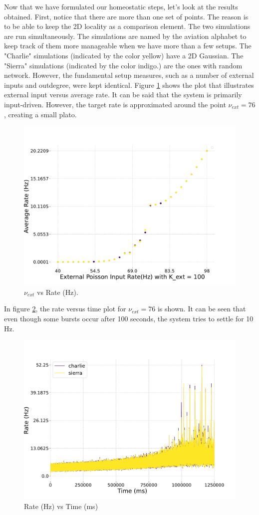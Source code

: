 \documentclass[a4paper,12pt]{article}
\begin{document}
Now that we have formulated our homeostatic steps, let's look at the results obtained. First, notice that there are more than one set of points. The reason is to be able to keep the 2D locality as a comparison element. The two simulations are run simultaneously. The simulations are named by the aviation alphabet to keep track of them more manageable when we have more than a few setups. The "Charlie" simulations (indicated by the color yellow) have a 2D Gaussian. The "Sierra" simulations (indicated by the color indigo.) are the ones with random network. However, the fundamental setup measures, such as a number of external inputs and outdegree, were kept identical. Figure \ref{charlie} shows the plot that illustrates external input versus average rate. It can be said that the system is primarily input-driven. However, the target rate is approximated around the point $\nu_{ext} = 76$, creating a small plato. 
\begin{figure}[H] 
    \centering
    \includegraphics[width=0.8\linewidth]{nuext_vs_activity_charlie.pdf}
    \caption{$\nu_{ext}$ vs Rate (Hz).}
    \label{charlie}
\end{figure}
In figure \ref{charlie76ratevstime}, the rate versus time plot for $\nu_{ext} = 76$ is shown. It can be seen that even though some bursts occur after 100 seconds, the system tries to settle for 10 Hz.
\begin{figure}[H] 
    \centering
    \includegraphics[width=0.8\linewidth]{nu_ext_76rate_over_time_homeostasis.pdf}
    \caption{Rate (Hz) vs Time (ms)}
    \label{charlie76ratevstime}
\end{figure}
\end{document}
